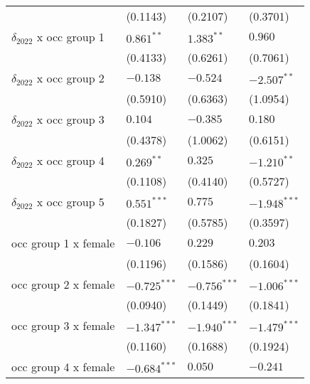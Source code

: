 \begin{tabular}{llll}
                                       &           (0.1143) &           (0.2107) &           (0.3701) \\
$\delta_{2022}$ x occ group 1          &       $0.861^{**}$ &       $1.383^{**}$ &            $0.960$ \\
                                       &           (0.4133) &           (0.6261) &           (0.7061) \\
$\delta_{2022}$ x occ group 2          &           $-0.138$ &           $-0.524$ &      $-2.507^{**}$ \\
                                       &           (0.5910) &           (0.6363) &           (1.0954) \\
$\delta_{2022}$ x occ group 3          &            $0.104$ &           $-0.385$ &            $0.180$ \\
                                       &           (0.4378) &           (1.0062) &           (0.6151) \\
$\delta_{2022}$ x occ group 4          &       $0.269^{**}$ &            $0.325$ &      $-1.210^{**}$ \\
                                       &           (0.1108) &           (0.4140) &           (0.5727) \\
$\delta_{2022}$ x occ group 5          &      $0.551^{***}$ &            $0.775$ &     $-1.948^{***}$ \\
                                       &           (0.1827) &           (0.5785) &           (0.3597) \\
occ group 1 x female                   &           $-0.106$ &            $0.229$ &            $0.203$ \\
                                       &           (0.1196) &           (0.1586) &           (0.1604) \\
occ group 2 x female                   &     $-0.725^{***}$ &     $-0.756^{***}$ &     $-1.006^{***}$ \\
                                       &           (0.0940) &           (0.1449) &           (0.1841) \\
occ group 3 x female                   &     $-1.347^{***}$ &     $-1.940^{***}$ &     $-1.479^{***}$ \\
                                       &           (0.1160) &           (0.1688) &           (0.1924) \\
occ group 4 x female                   &     $-0.684^{***}$ &            $0.050$ &           $-0.241$ \\

\end{tabular}
